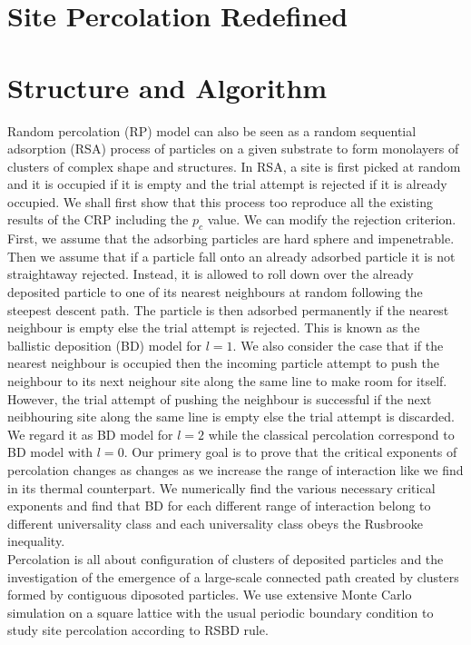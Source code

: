 \section{Site Percolation Redefined}

\section{Structure and Algorithm}
Random percolation (RP) model can also be seen as a random sequential adsorption (RSA) process of particles on a given substrate to form monolayers of clusters of complex shape and structures. In RSA, a site is first picked at random and it is occupied if it is empty and the trial attempt is rejected if it is already occupied. We shall first show that this process too reproduce all the existing results of the CRP including the $p_c$ value. We can modify the rejection criterion. First, we assume that the adsorbing particles are hard sphere and impenetrable. Then we assume that if a particle fall onto an already adsorbed particle it is not straightaway rejected. Instead, it is allowed to roll down over the already deposited particle to one of its nearest neighbours at random following the steepest descent path. The particle is then adsorbed permanently if the nearest neighbour is empty else the trial attempt is rejected. This is known as the ballistic deposition (BD) model for $l = 1$. We also consider the case that if the nearest neighbour is occupied then the incoming particle attempt to push the neighbour to its next neighour site along the same line to make room for itself. However, the trial attempt of pushing the neighbour is successful if the next neibhouring site along the same line is empty else the trial attempt is discarded. We regard it as BD model for $l = 2$ while the classical percolation correspond to BD model with $l = 0$. Our primery goal is to prove that the critical exponents of percolation changes as changes as we increase the range of interaction like we find in its thermal counterpart. We numerically find the various necessary critical exponents and find that BD for each different range of interaction belong to different universality class and each universality class
obeys the Rusbrooke inequality.\\

Percolation is all about configuration of clusters of deposited particles and the investigation of the emergence of a large-scale connected path created by clusters formed by contiguous diposoted particles. We use extensive Monte Carlo simulation on a square lattice with the usual periodic boundary condition to study site percolation according to RSBD rule.\\

